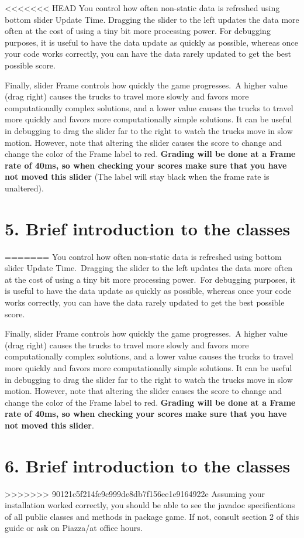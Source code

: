 \documentclass[11pt]{article}
\begin{document}
\begin{itemize}
<<<<<<< HEAD
You control how often non-static data is refreshed using bottom slider Update Time. Dragging the slider to the left updates the data more often at the cost of using a tiny bit more processing 
power. For debugging purposes, it is useful to have the data update as quickly as possible, whereas once your code works correctly, you can have the data rarely updated to get the best possible score.

Finally, slider  Frame controls how quickly the game progresses.\ A higher value (drag right) causes the trucks to travel more slowly and favors more computationally complex solutions, and a lower value causes the trucks to travel more quickly and favors more computationally simple solutions. It can be useful in debugging to drag the slider far to the right to watch the trucks move in slow motion. However, note that altering the slider causes the score to change and change the color of the Frame label to red. \textbf{Grading will be done at a Frame rate of 40ms, so when checking your scores make sure that you have not moved this slider} (The label will stay black when the frame rate is unaltered).

\section{5. Brief introduction to the classes}
=======
You control how often non-static data is refreshed using bottom slider Update Time.\ Dragging the slider to the left updates the data more often at the cost of using a tiny bit more processing 
power.\ For debugging purposes, it is useful to have the data update as quickly as possible, whereas once your code works correctly, you can have the data rarely updated to get the best possible score.

Finally, slider  Frame controls how quickly the game progresses.\ A higher value (drag right) causes the trucks to travel more slowly and favors more computationally complex solutions, and a lower value causes the trucks to travel more quickly and favors more computationally simple solutions. It can be useful in debugging to drag the slider far to the right to watch the trucks move in slow motion. However, note that altering the slider causes the score to change and change the color of the Frame label to red. \textbf{Grading will be done at a Frame rate of 40ms, so when checking your scores make sure that you have not moved this slider}.


\section{6. Brief introduction to the classes}
>>>>>>> 90121c5f214fe9c999de8db7f156ee1e9164922e
Assuming your installation worked correctly, you should be able to see the javadoc specifications of all public classes and methods in package game.
If not, consult section 2 of this guide or ask on Piazza/at office hours.\\


\end{itemize}
\end{document}
